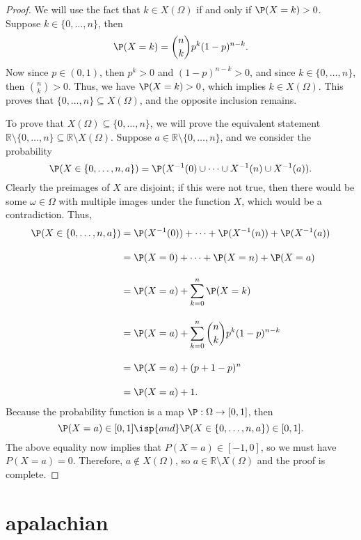 \documentclass[12pt]{article}
\newcommand{\R}{\mathbb{R}}
\begin{document}
\begin{proof}
    We will use the fact that $k \in X(\Omega)$ if and only if $\P(X = k) > 0$. Suppose $k \in \{0, \dots, n\}$, then
    \[\P(X = k) = \binom{n}{k}p^k(1-p)^{n-k}.\]
    Now since $p \in (0, 1)$, then $p^k > 0$ and $(1-p)^{n-k} > 0$, and since $k \in \{0, \dots, n\}$, then $\binom{n}{k} > 0$. Thus, we have $\P(X = k) > 0$, which implies $k \in X(\Omega)$. This proves that $\{0, \dots, n\} \subseteq X(\Omega)$, and the opposite inclusion remains.
    
    To prove that $X(\Omega) \subseteq \{0,\dots, n\}$, we will prove the equivalent statement $\R \setminus \{0, \dots, n\} \subseteq \R \setminus X(\Omega)$. Suppose $a \in \R \setminus \{0, \dots, n\}$, and we consider the probability
    \[\P(X \in \{0, \dots, n, a\}) = \P(X^{-1}(0) \cup \cdots \cup X^{-1}(n) \cup X^{-1}(a)).\]
    Clearly the preimages of $X$ are disjoint; if this were not true, then there would be some $\omega \in \Omega$ with multiple images under the function $X$, which would be a contradiction. Thus,
    \begin{align*}
        \P(X \in \{0, \dots, n, a\})
            &= \P(X^{-1}(0)) + \cdots + \P(X^{-1}(n)) + \P(X^{-1}(a)) \\[1em]
            &= \P(X = 0) + \cdots + \P(X = n) + \P(X = a) \\[1em]
            &= \P(X = a) + \sum_{k=0}^n \P(X = k) \\[1em]
            &= \P(X = a) + \sum_{k=0}^n \binom{n}{k}p^k(1-p)^{n-k} \\[1em]
            &= \P(X = a) + (p + 1 - p)^n \\[1em]
            &= \P(X = a) + 1.
    \end{align*}
    Because the probability function is a map $\P:\Omega \to [0, 1]$, then 
    \[\P(X = a) \in [0, 1] \isp{and} \P(X \in \{0, \dots, n, a\}) \in [0, 1].\]
    The above equality now implies that $P(X = a) \in [-1, 0]$, so we must have $P(X = a) = 0$. Therefore, $a \notin X(\Omega)$, so $a \in \R \setminus X(\Omega)$ and the proof is complete.
    
\end{proof}

\section{apalachian}
\end{document}
